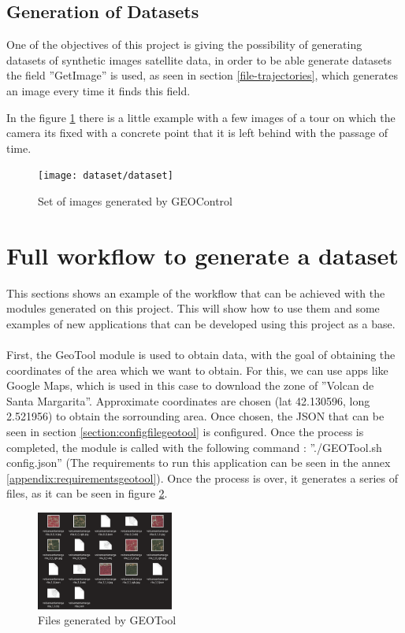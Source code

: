 \documentclass[10pt,a4paper,twocolumn,twoside]{article}
\begin{document}
\subsection{Generation of Datasets}
One of the objectives of this project is giving the possibility of generating datasets of synthetic images satellite data, in order to be able generate datasets the field ''GetImage'' is used, as seen in section \ref{file-trajectories}, which generates an image every time it finds this field.

In the figure \ref{fig-dataset} there is a little example with a few images of a tour on which the camera its fixed with a concrete point that it is left behind with the passage of time.

\begin{figure}[!h]
\centering
  	\texttt{[image: dataset/dataset]}
	\caption{Set of images generated by GEOControl}
	\label{fig-dataset}
\end{figure}

\section{Full workflow to generate a dataset}

This sections shows an example of the workflow that can be achieved with the modules generated on this project. This will show how to use them and some examples of new applications that can be developed using this project as a base.
\\
\\
First, the GeoTool module is used to obtain data, with the goal of obtaining the coordinates of the area which we want to obtain. For this, we can use apps like Google Maps, which is used in this case to download the zone of ''Volcan de Santa Margarita''. Approximate coordinates are chosen (lat 42.130596, long 2.521956) to obtain the sorrounding area. Once chosen, the JSON that can be seen in section \ref{section:configfilegeotool} is configured. Once the process is completed, the module is called with the following command : ''./GEOTool.sh config.json'' (The requirements to run this application can be seen in the annex \ref{appendix:requirementsgeotool}). Once the process is over, it generates a series of files, as it can be seen in figure \ref{fig-filesgeotool}.

\begin{figure}[!h]
\centering
  	\includegraphics[width=0.4\textwidth]{filesgeotool}
	\caption{Files generated by GEOTool}
	\label{fig-filesgeotool}
\end{figure}
\end{document}
